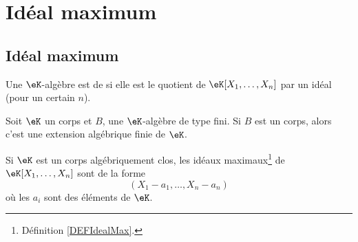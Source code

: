 \section{Idéal maximum}

\subsection{Idéal maximum}

\begin{definition}  \label{DefWHDdTrC}
	Une \( \eK\)-algèbre est de  si elle est le quotient de \( \eK[X_1,\ldots, X_n]\) par un idéal (pour un certain \( n\)).
\end{definition}

\begin{theorem}      \label{ThonoZyKa}
	Soit \( \eK\) un corps et \( B\), une \( \eK\)-algèbre de type fini. Si \( B\) est un corps, alors c'est une extension algébrique finie de \( \eK\).
\end{theorem}

\begin{theorem}  \label{ThowgZYqx}
    Si \( \eK\) est un corps algébriquement clos, les idéaux maximaux\footnote{Définition \ref{DEFIdealMax}.} de \( \eK[X_1,\ldots, X_n]\) sont de la forme
	\begin{equation}
		(X_1-a_1,\ldots, X_n-a_n)
	\end{equation}
	où les \( a_i\) sont des éléments de \( \eK\).
\end{theorem}

